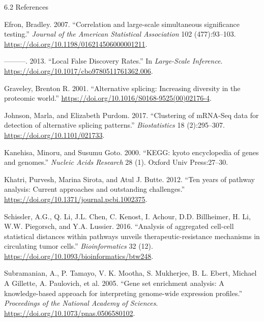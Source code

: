 \documentclass[ignorenonframetext,aspectratio=169,]{beamer}
\begin{document}
\begin{frame}{%
\protect\hypertarget{references}{%
6.2 References}}

\hypertarget{refs}{}
\leavevmode\hypertarget{ref-Efron2007a}{}%
Efron, Bradley. 2007. “Correlation and large-scale simultaneous
significance testing.” \emph{Journal of the American Statistical
Association} 102 (477):93–103.
\url{https://doi.org/10.1198/016214506000001211}.

\leavevmode\hypertarget{ref-Efron2013}{}%
———. 2013. “Local False Discovery Rates.” In \emph{Large-Scale
Inference}. \url{https://doi.org/10.1017/cbo9780511761362.006}.

\leavevmode\hypertarget{ref-Graveley2001}{}%
Graveley, Brenton R. 2001. “Alternative splicing: Increasing diversity
in the proteomic world.”
\url{https://doi.org/10.1016/S0168-9525(00)02176-4}.

\leavevmode\hypertarget{ref-Johnson2017}{}%
Johnson, Marla, and Elizabeth Purdom. 2017. “Clustering of mRNA-Seq data
for detection of alternative splicing patterns.” \emph{Biostatistics} 18
(2):295–307. \url{https://doi.org/10.1101/021733}.

\leavevmode\hypertarget{ref-kanehisa2000kegg}{}%
Kanehisa, Minoru, and Susumu Goto. 2000. “KEGG: kyoto encyclopedia of
genes and genomes.” \emph{Nucleic Acids Research} 28 (1). Oxford Univ
Press:27–30.

\leavevmode\hypertarget{ref-Khatri2012n1pas}{}%
Khatri, Purvesh, Marina Sirota, and Atul J. Butte. 2012. “Ten years of
pathway analysis: Current approaches and outstanding challenges.”
\url{https://doi.org/10.1371/journal.pcbi.1002375}.

\leavevmode\hypertarget{ref-Schissler2016a}{}%
Schissler, A.G., Q. Li, J.L. Chen, C. Kenost, I. Achour, D.D.
Billheimer, H. Li, W.W. Piegorsch, and Y.A. Lussier. 2016. “Analysis of
aggregated cell-cell statistical distances within pathways unveils
therapeutic-resistance mechanisms in circulating tumor cells.”
\emph{Bioinformatics} 32 (12).
\url{https://doi.org/10.1093/bioinformatics/btw248}.

\leavevmode\hypertarget{ref-Subramanian2005}{}%
Subramanian, A., P. Tamayo, V. K. Mootha, S. Mukherjee, B. L. Ebert,
Michael A Gillette, A. Paulovich, et al. 2005. “Gene set enrichment
analysis: A knowledge-based approach for interpreting genome-wide
expression profiles.” \emph{Proceedings of the National Academy of
Sciences}. \url{https://doi.org/10.1073/pnas.0506580102}.

\end{frame}
\end{document}
